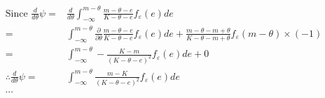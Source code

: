 \begin{align}
    \text{Since } \frac{d}{d\theta} \psi
        =& \frac{d}{d\theta} \int_{-\infty}^{m-\theta} \frac{m - \theta - e }{K - \theta - e} f_\varepsilon(e) de \\
        =& \int_{-\infty}^{m-\theta} \frac{\partial}{\partial \theta} \frac{m - \theta - e }{K - \theta - e} f_\varepsilon(e) de + \frac{m - \theta - m + \theta }{K - \theta - m + \theta} f_\varepsilon(m-\theta) \times (-1) \\
        =& \int_{-\infty}^{m-\theta} - \frac{K - m }{(K - \theta - e)^2} f_\varepsilon(e) de + 0 \\
    \therefore \frac{d}{d\theta} \psi =& \int_{-\infty}^{m-\theta} \frac{m - K }{(K - \theta - e)^2} f_\varepsilon(e) de \\
    \cdots
\end{align}

\endgroup
